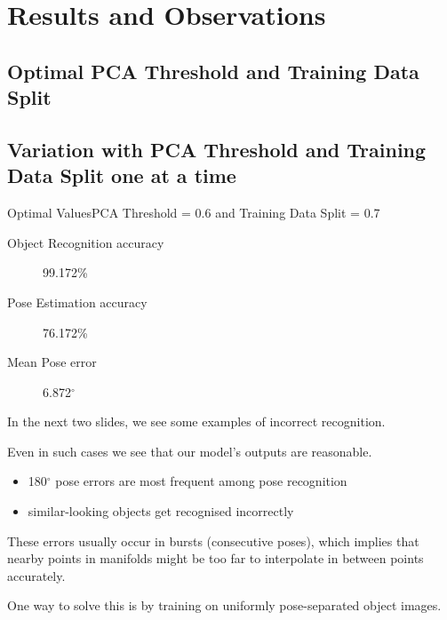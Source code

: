 \documentclass[aspectratio=169, handout, 10pt, hyperref=colorlinks]{beamer}
\begin{document}
\section{Results and Observations}
\subsection{Optimal PCA Threshold and Training Data Split}
\subsection{Variation with PCA Threshold and Training Data Split one at a time}
\begin{frame}{Optimal Values}{PCA Threshold = 0.6 and Training Data Split = 0.7}
    \begin{description}
        \item[Object Recognition accuracy]  99.172\%
        \item[Pose Estimation accuracy] 76.172\%
        \item[Mean Pose error] 6.872$^\circ$
    \end{description}
    In the next two slides, we see some examples of incorrect recognition. 
    
    Even in such cases we see that our model's outputs are reasonable.
    \begin{itemize}
        \item 180$^\circ$ pose errors are most frequent among pose recognition
        \item similar-looking objects get recognised incorrectly
    \end{itemize}
    These errors usually occur in bursts (consecutive poses), which implies that nearby points in manifolds might be too far to interpolate in between points accurately.
    
    One way to solve this is by training on uniformly pose-separated object images.
    
\end{frame}
\end{document}
